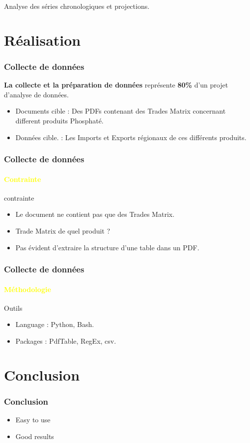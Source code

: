 \documentclass{beamer}
\begin{document}
	\begin{frame}{Analyse des séries chronologiques et projections.}
	
	\end{frame}

\section{Réalisation}

\begin{frame}
  \frametitle{Collecte de données}
  \textbf{La collecte et la préparation de données} représente \textbf{80\%} d'un projet d'analyse de données.\\
  \begin{itemize}
    \item Documents cible : Des PDFs contenant des Trades Matrix concernant different produits Phosphaté.
    \item Données cible. : Les Imports et Exports régionaux de ces différents produits.
  \end{itemize}
\end{frame}

\begin{frame}
  \frametitle{Collecte de données}
  \framesubtitle{\textbf{\textcolor{yellow}{Contrainte}}}
  \begin{block}{contrainte}
  	\begin{itemize}
    		\item Le document ne contient pas que des Trades Matrix.
    		\item Trade Matrix de quel produit ?
    		\item Pas évident d'extraire la structure d'une table dans un PDF.
  	\end{itemize}
  \end{block}
\end{frame}

\begin{frame}
  \frametitle{Collecte de données}
  \framesubtitle{\textbf{\textcolor{yellow}{Méthodologie}}}
  \begin{block}{Outils}
  	\begin{itemize}
    		\item Language : Python, Bash.
    		\item Packages : PdfTable, RegEx, csv.
  	\end{itemize}
  \end{block}
\end{frame}

\section{Conclusion}

\begin{frame}
  \frametitle{Conclusion}

  \begin{itemize}
    \item Easy to use
    \item Good results
  \end{itemize}
\end{frame}
\end{document}
